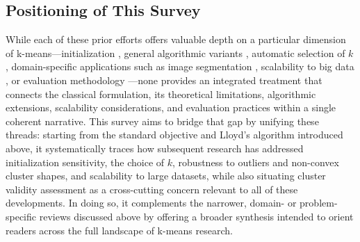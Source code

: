 \subsection{Positioning of This Survey}
While each of these prior efforts offers valuable depth on a particular dimension of k-means---initialization \cite{celebi2012comparative}, general algorithmic variants \cite{chong2021means,oti2021comprehensive}, automatic selection of $k$ \cite{sinaga2020unsupervised}, domain-specific applications such as image segmentation \cite{sattarov2023unveiling,mukherjee2025survey}, scalability to big data \cite{mahdi2021scalable,mussabayev2023comparative}, or evaluation methodology \cite{ikotun2025cluster}---none provides an integrated treatment that connects the classical formulation, its theoretical limitations, algorithmic extensions, scalability considerations, and evaluation practices within a single coherent narrative. This survey aims to bridge that gap by unifying these threads: starting from the standard objective and Lloyd's algorithm introduced above, it systematically traces how subsequent research has addressed initialization sensitivity, the choice of $k$, robustness to outliers and non-convex cluster shapes, and scalability to large datasets, while also situating cluster validity assessment as a cross-cutting concern relevant to all of these developments. In doing so, it complements the narrower, domain- or problem-specific reviews discussed above by offering a broader synthesis intended to orient readers across the full landscape of k-means research.

